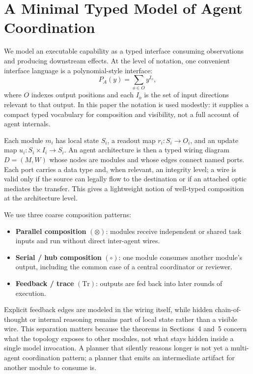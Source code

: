 \section{A Minimal Typed Model of Agent Coordination}

We model an executable capability as a typed interface consuming observations and producing downstream
effects. At the level of notation, one convenient interface language is a polynomial-style interface:
\begin{equation}
P_A(y) = \sum_{o \in O} y^{I_o},
\end{equation}
where $O$ indexes output positions and each $I_o$ is the set of input directions relevant to that
output. In this paper the notation is used modestly: it supplies a compact typed vocabulary for
composition and visibility, not a full account of agent internals.

Each module $m_i$ has local state $S_i$, a readout map $r_i : S_i \to O_i$, and an update map
$u_i : S_i \times I_i \to S_i$. An agent architecture is then a typed wiring diagram
$D = (M, W)$ whose nodes are modules and whose edges connect named ports. Each port carries a data type
and, when relevant, an integrity level; a wire is valid only if the source can legally flow to the
destination or if an attached optic mediates the transfer. This gives a lightweight notion of
well-typed composition at the architecture level.

We use three coarse composition patterns:
\begin{itemize}[leftmargin=*]
\item \textbf{Parallel composition} $(\otimes)$: modules receive independent or shared task inputs and run
without direct inter-agent wires.
\item \textbf{Serial / hub composition} $(\circ)$: one module consumes another module's output, including
the common case of a central coordinator or reviewer.
\item \textbf{Feedback / trace} $(\mathrm{Tr})$: outputs are fed back into later rounds of execution.
\end{itemize}

Explicit feedback edges are modeled in the wiring itself, while hidden chain-of-thought or internal
reasoning remains part of local state rather than a visible wire. This separation matters because the
theorems in Sections~4 and~5 concern what the topology exposes to other modules, not what stays hidden
inside a single model invocation. A planner that silently reasons longer is not yet a multi-agent
coordination pattern; a planner that emits an intermediate artifact for another module to consume is.
